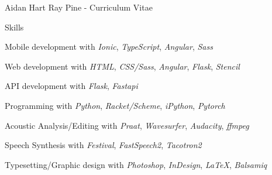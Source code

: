 \documentclass[12pt]{letter}
\begin{document}
\begin{cv}{ Aidan Hart Ray Pine  \space - \space   Curriculum Vitae}
         \begin{cvlist}{Skills}
                        \item Mobile development with  \textit{Ionic},  \textit{TypeScript},  \textit{Angular},  \textit{Sass}                         \item Web development with  \textit{HTML},  \textit{CSS/Sass},  \textit{Angular},  \textit{Flask},  \textit{Stencil}                         \item API development with  \textit{Flask},  \textit{Fastapi}                         \item Programming with  \textit{Python},  \textit{Racket/Scheme},  \textit{iPython},  \textit{Pytorch}                         \item Acoustic Analysis/Editing with  \textit{Praat},  \textit{Wavesurfer},  \textit{Audacity},  \textit{ffmpeg}                         \item Speech Synthesis with  \textit{Festival},  \textit{FastSpeech2},  \textit{Tacotron2}                         \item Typesetting/Graphic design with  \textit{Photoshop},  \textit{InDesign},  \textit{\LaTeX},  \textit{Balsamiq}                      \end{cvlist}


\end{cv}
\end{document}
